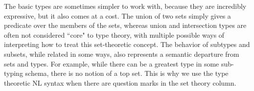 
The basic types are sometimes simpler to work with, because they are incredibly
expressive, but it also comes at a cost. The union of two sets simply gives a
predicate over the members of the sets, whereas union and intersection types are
often not considered ``core" to type theory, with multiple possible ways of
interpreting how to treat this set-theoretic concept. The behavior of subtypes
and subsets, while related in some ways, also represents a semantic departure
from sets and types. For example, while there can be a greatest type in some
sub-typing schema, there is no notion of a top set. This is why we use the type
theoretic NL syntax when there are question marks in the set theory column.

